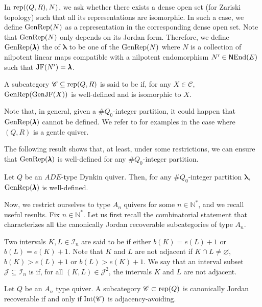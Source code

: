 In $\operatorname{rep}((Q,R),N)$, we ask whether there exists a dense open set (for Zariski topology) such that all its representations are isomorphic. In such a case, we define $\operatorname{GenRep}(N)$ as a representation in the corresponding dense open set. Note that $\operatorname{GenRep}(N)$ only depends on its Jordan form. Therefore, we define $\operatorname{GenRep}(\pmb{\lambda})$ the  of $\pmb{\lambda}$ to be one of the $\operatorname{GenRep}(N)$ where $N$ is a collection of nilpotent linear maps compatible with a nilpotent endomorphism $N' \in \operatorname{\mathsf{N}End}(E)$ such that $\operatorname{JF}(N') = \pmb{\lambda}$.

\begin{definition} \label{def:CJR} A subcategory $\mathscr{C} \subseteq \operatorname{rep}(Q,R)$ is said to be  if, for any $X \in \mathscr{C}$, $\operatorname{GenRep}(\operatorname{GenJF}(X))$ is well-defined and is isomorphic to $X$.
\end{definition}

Note that, in general, given a $\#Q_0$-integer partition, it could happen that $\operatorname{GenRep}(\pmb{\lambda})$ cannot be defined. We refer to \cite[Examples 2.21 and 2.23]{D22} for examples in the case where $(Q,R)$ is a gentle quiver.

The following result shows that, at least, under some restrictions, we can ensure that $\operatorname{GenRep}(\pmb{\lambda})$ is well-defined for any $\#Q_0$-integer partition.

\begin{prop} \label{prop:GenRepDynkin}
    Let $Q$ be an $ ADE$-type Dynkin quiver. Then, for any $\#Q_0$-integer partition $\pmb{\lambda}$, $\operatorname{GenRep}(\pmb{\lambda})$ is well-defined.
\end{prop}

Now, we restrict ourselves to type $A_n$ quivers for some $n \in \mathbb{N}^*$, and we recall useful results. Fix $n \in \mathbb{N}^*$. Let us first recall the combinatorial statement that characterizes all the canonically Jordan recoverable subcategories of type $A_n$.

Two intervals $K,L \in \mathcal{I}_n$ are said to be  if either $b(K) = e(L)+1$ or $b(L) = e(K)+1$. Note that $K$ and $L$ are not adjacent if $K \cap L \neq \varnothing$, $b(K) > e(L)+1$ or $b(L) > e(K)+1$. We say that an interval subset $\mathscr{J} \subseteq \mathcal{I}_n$ is  if, for all $(K,L) \in \mathscr{J}^2$, the intervals $K$ and $L$ are not adjacent.

\begin{theorem} \label{thm:typeACJRcombi}Let $Q$ be an $A_n$ type quiver. A subcategory $\mathscr{C} \subset \operatorname{rep}(Q)$ is canonically Jordan recoverable if and only if $\operatorname{Int}(\mathscr{C})$ is adjacency-avoiding.
\end{theorem}


